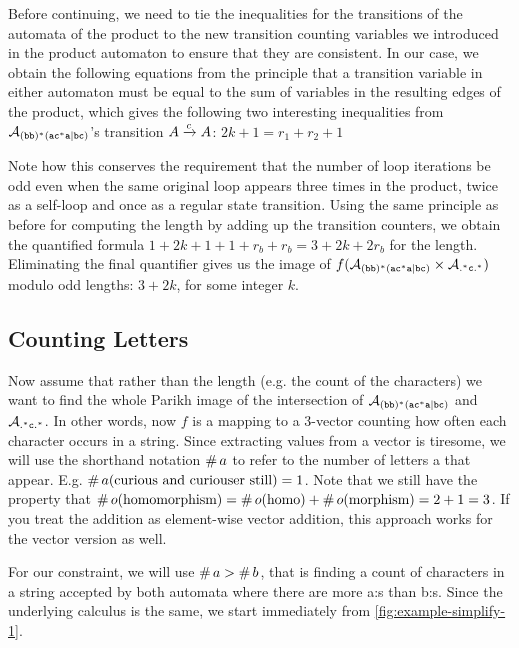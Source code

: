 \documentclass[acmsmall,review,anonymous,screen]{acmart}\settopmatter{printfolios=true,printccs=true,printacmref=true}
\theoremstyle{definition}
\begin{document}
Before continuing, we need to tie the inequalities for the transitions of the
automata of the product to the new transition counting variables we introduced
in the product automaton to ensure that they are consistent. In our case, we
obtain the following equations from the principle that a transition variable in
either automaton must be equal to the sum of variables in the resulting edges of
the product, which gives the following two interesting inequalities from
$\mathcal{A}_{\mathtt{(bb)^\ast(ac^\ast{}a|bc)}}{}$'s transition $A \xrightarrow{c} A$: $2k + 1 = r_1 + r_2 + 1$

Note how this conserves the requirement that the number of loop iterations be
odd even when the same original loop appears three times in the product, twice
as a self-loop and once as a regular state transition. Using the same principle
as before for computing the length by adding up the transition counters, we
obtain the quantified formula $1 + 2k + 1 + 1 + r_b + r_b= 3 + 2k + 2r_b$ for
the length. Eliminating the final quantifier gives us the image of $f(\mathcal{A}_{\mathtt{(bb)^\ast(ac^\ast{}a|bc)}}
\times \mathcal{A}_{\mathtt{.^\ast{}c.^\ast}})$ modulo odd lengths: $3 + 2k$, for some integer
$k$.

\subsection{Counting Letters}\label{sec:introduction:parikh}

Now assume that rather than the length (e.g. the count of the characters) we
want to find the whole Parikh image of the intersection of $\mathcal{A}_{\mathtt{(bb)^\ast(ac^\ast{}a|bc)}}{}$ and
$\mathcal{A}_{\mathtt{.^\ast{}c.^\ast}}{}$. In other words, now $f$ is a mapping to a 3-vector
counting how often each character occurs in a string. Since extracting values
from a vector is tiresome, we will use the shorthand notation
$\operatorname{\#}{a}$ to refer to the number of letters a that appear. E.g.
$\operatorname{\#}{a}(\text{curious and curiouser still}) = 1$. Note that we
still have the property that $\operatorname{\#}{o}(\text{homomorphism}) =
\operatorname{\#}{o}(\text{homo}) + \operatorname{\#}{o}(\text{morphism}) = 2 + 1
= 3$. If you treat the addition as element-wise vector addition, this approach
works for the vector version as well.

For our constraint, we will use $\operatorname{\#}{a} > \operatorname{\#}{b}$,
that is finding a count of characters in a string accepted by both automata where
there are more a:s than b:s. Since the underlying calculus is the same, we start immediately from \cref{fig:example-simplify-1}.
\end{document}
